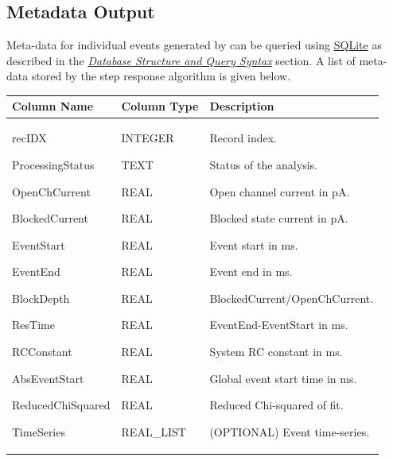 \documentclass[letterpaper,10pt,english]{sphinxmanual}
\begin{document}
\subsection{Metadata Output}
\label{doc/Algorithms:metadata-output}
Meta-data for individual events generated by {\hyperref[api\string-doc/mosaic.processing:mosaic.adept2State.adept2State]{\emph{}}} can be queried using \href{http://www.sqlite.org/}{SQLite} as described in the {\hyperref[doc/DatabaseStructure:database\string-page]{\emph{Database Structure and Query Syntax}}} section. A list of meta-data stored by the step response algorithm is given below.

\begin{tabulary}{\linewidth}{p{4cm}p{4cm}p{6cm}}
\hline
\textsf{\relax 
\textbf{Column Name}
} & \textsf{\relax 
\textbf{Column Type}
} & \textsf{\relax 
\textbf{Description}
}\\
\hline
recIDX

ProcessingStatus

OpenChCurrent

BlockedCurrent

EventStart

EventEnd

BlockDepth

ResTime

RCConstant

AbsEventStart

ReducedChiSquared

TimeSeries
 & 
INTEGER

TEXT

REAL

REAL

REAL

REAL

REAL

REAL

REAL

REAL

REAL

REAL\_LIST
 & 
Record index.

Status of the analysis.

Open channel current in pA.

Blocked state current in pA.

Event start in ms.

Event end in ms.

BlockedCurrent/OpenChCurrent.

EventEnd-EventStart in ms.

System RC constant in ms.

Global event start time in ms.

Reduced Chi-squared of fit.

(OPTIONAL) Event time-series.
\\
\hline\end{tabulary}
\end{document}
